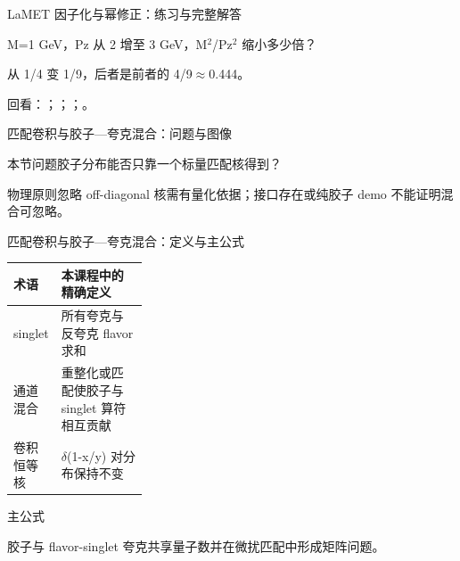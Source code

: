 \begin{frame}[t]{LaMET 因子化与幂修正：练习与完整解答}
\footnotesize
\begin{block}{}M=1 GeV，Pz 从 2 增至 3 GeV，M\ensuremath{^{2}}/\allowbreak{}Pz\ensuremath{^{2}} 缩小多少倍？\end{block}
\begin{exampleblock}{}从 1/\allowbreak{}4 变 1/\allowbreak{}9，后者是前者的 4/\allowbreak{}9\ensuremath{\approx}0.444。\end{exampleblock}
\vfill
\scriptsize 回看：；；；。
\end{frame}

\begin{frame}[t]{匹配卷积与胶子—夸克混合：问题与图像}
\footnotesize
\begin{block}{本节问题}胶子分布能否只靠一个标量匹配核得到？\end{block}
\begin{block}{物理原则}\quad 忽略 off-diagonal 核需有量化依据；接口存在或纯胶子 demo 不能证明混合可忽略。\end{block}
\end{frame}

\begin{frame}[t]{匹配卷积与胶子—夸克混合：定义与主公式}
\footnotesize\begin{tabularx}{\linewidth}{p{0.30\linewidth}Y}
\toprule 术语 & 本课程中的精确定义\\\midrule
{} singlet & 所有夸克与反夸克 flavor 求和\\
 通道混合 & 重整化或匹配使胶子与 singlet 算符相互贡献\\
 卷积恒等核 & \ensuremath{\delta}(1-x/\allowbreak{}y) 对分布保持不变\\
\bottomrule\end{tabularx}\vspace{0.15cm}
\begin{block}{ 主公式}\centering{}\end{block}
胶子与 flavor-singlet 夸克共享量子数并在微扰匹配中形成矩阵问题。
\end{frame}

